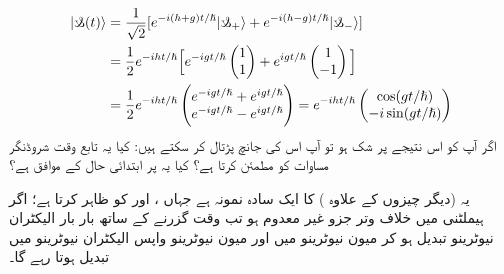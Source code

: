 \begin{align*}
| \s (t) \rangle &= \frac{1}{\sqrt{2}} [ e^{-i(h+g)t/\hslash} | \s_{+} \rangle + e^{-i(h-g)t/\hslash} | \s_{-} \rangle ] \\
&= \frac{1}{2} e^{-iht/\hslash} \Big[ e^{-igt/\hslash} \begin{pmatrix} 1 \\ 1 \end{pmatrix} + e^{igt/\hslash} \begin{pmatrix} 1 \\ -1 \end{pmatrix} \Big] \\
&= \frac{1}{2} e^{-iht/\hslash} \begin{pmatrix} e^{-igt/\hslash} + e^{igt/\hslash} \\ e^{-igt/\hslash} - e^{igt/\hslash} \end{pmatrix} = e^{-iht/\hslash} \begin{pmatrix} \cos (gt/\hslash) \\ -i\sin (gt/\hslash) \end{pmatrix}
\end{align*}
اگر آپ کو اس نتیجے پر شک ہو تو آپ اس کی جانچ پڑتال کر سکتے ہیں: کیا یہ تابع وقت شروڈنگر مساوات کو مطمئن کرتا ہے؟ کیا یہ  پر ابتدائی حال کے موافق ہے؟ 

یہ (دیگر چیزوں کے علاوہ )  کا ایک سادہ نمونہ ہے جہاں  ، اور  کو ظاہر کرتا ہے؛ اگر ہیملٹنی میں خلاف وتر جزو  غیر معدوم ہو تب وقت گزرنے کے ساتھ بار بار الیکٹران نیوٹرینو تبدیل ہو کر میون نیوٹرینو میں اور میون نیوٹرینو واپس الیکٹران نیوٹرینو میں تبدیل ہوتا رہے گا۔


